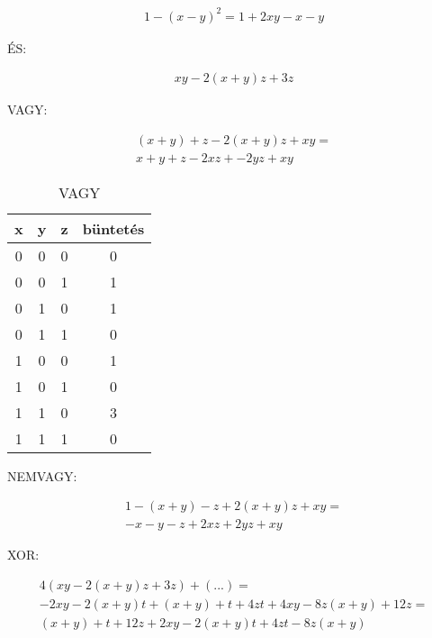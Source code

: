 \begin{align}
	1-(x-y)^2=1+2xy-x-y
\end{align}


ÉS:

\begin{align}
	xy-2(x+y)z+3z
\end{align}


VAGY:

\begin{align}
	(x+y)+z-2(x+y)z+xy = \\
	x+y+z-2xz+-2yz+xy
\end{align}

\begin{table}[ht]
	\footnotesize
	\centering
	\begin{tabular}{ c c c c }
		\toprule
		x & y & z & büntetés \\
		\midrule
		0 & 0 & 0 & 0 \\
		0 & 0 & 1 & 1 \\
		0 & 1 & 0 & 1 \\
		0 & 1 & 1 & 0 \\
		1 & 0 & 0 & 1 \\
		1 & 0 & 1 & 0 \\
		1 & 1 & 0 & 3 \\
		1 & 1 & 1 & 0 \\
		
		\bottomrule
	\end{tabular}
	\caption{VAGY}
	\label{tab:VAGY}
\end{table}

NEMVAGY:

\begin{align}
	1-(x+y)-z+2(x+y)z+xy = \\
	 -x-y-z+2xz+2yz+xy
\end{align}

XOR:

\begin{align}
	4(xy-2(x+y)z+3z)+(...) = \\
	-2xy-2(x+y)t+(x+y)+t+4zt+4xy-8z(x+y)+12z = \\
	(x+y)+t+12z+2xy-2(x+y)t+4zt-8z(x+y)
\end{align}


